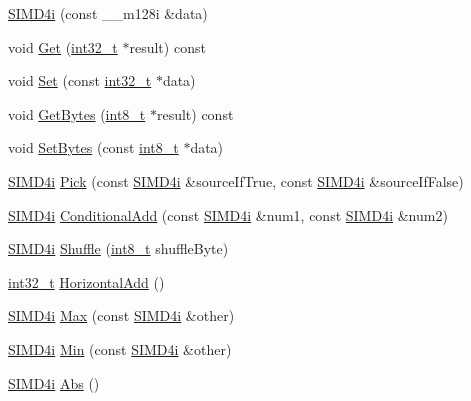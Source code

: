 \begin{DoxyCompactItemize}
\item 
\hyperlink{class_s_i_m_d4i_a9d5c452e93657a04168de24436145454}{S\+I\+M\+D4i} (const \+\_\+\+\_\+m128i \&data)
\item 
void \hyperlink{class_s_i_m_d4i_a7f212da9b94db04c3f146af7a139d9ba}{Get} (\hyperlink{simddefines_8h_ab1967d8591af1a4e48c37fd2b0f184d0}{int32\+\_\+t} $\ast$result) const 
\item 
void \hyperlink{class_s_i_m_d4i_a5fa89cf5be6321da68dd0410d2c78877}{Set} (const \hyperlink{simddefines_8h_ab1967d8591af1a4e48c37fd2b0f184d0}{int32\+\_\+t} $\ast$data)
\item 
void \hyperlink{class_s_i_m_d4i_a5ae9dad273cdb5a7a63ba7c83880c314}{Get\+Bytes} (\hyperlink{simddefines_8h_aef44329758059c91c76d334e8fc09700}{int8\+\_\+t} $\ast$result) const 
\item 
void \hyperlink{class_s_i_m_d4i_a9d606d120af4f52ba32407e970000060}{Set\+Bytes} (const \hyperlink{simddefines_8h_aef44329758059c91c76d334e8fc09700}{int8\+\_\+t} $\ast$data)
\item 
\hyperlink{class_s_i_m_d4i}{S\+I\+M\+D4i} \hyperlink{class_s_i_m_d4i_ad78f06818f79a43994e4f4cb7339f5ea}{Pick} (const \hyperlink{class_s_i_m_d4i}{S\+I\+M\+D4i} \&source\+If\+True, const \hyperlink{class_s_i_m_d4i}{S\+I\+M\+D4i} \&source\+If\+False)
\item 
\hyperlink{class_s_i_m_d4i}{S\+I\+M\+D4i} \hyperlink{class_s_i_m_d4i_a62d3294324d4a18391edc89237dba7e8}{Conditional\+Add} (const \hyperlink{class_s_i_m_d4i}{S\+I\+M\+D4i} \&num1, const \hyperlink{class_s_i_m_d4i}{S\+I\+M\+D4i} \&num2)
\item 
\hyperlink{class_s_i_m_d4i}{S\+I\+M\+D4i} \hyperlink{class_s_i_m_d4i_abffef0eeb3a187e0ce3c0758f50ed34b}{Shuffle} (\hyperlink{simddefines_8h_aef44329758059c91c76d334e8fc09700}{int8\+\_\+t} shuffle\+Byte)
\item 
\hyperlink{simddefines_8h_ab1967d8591af1a4e48c37fd2b0f184d0}{int32\+\_\+t} \hyperlink{class_s_i_m_d4i_a91c7784a2928c70413ea2138d3cc2e60}{Horizontal\+Add} ()
\item 
\hyperlink{class_s_i_m_d4i}{S\+I\+M\+D4i} \hyperlink{class_s_i_m_d4i_a5dead3fb2787d20ed2ede5fcb87546d2}{Max} (const \hyperlink{class_s_i_m_d4i}{S\+I\+M\+D4i} \&other)
\item 
\hyperlink{class_s_i_m_d4i}{S\+I\+M\+D4i} \hyperlink{class_s_i_m_d4i_aaa3c6d22f98c3f2fcb9f22a562a70f8e}{Min} (const \hyperlink{class_s_i_m_d4i}{S\+I\+M\+D4i} \&other)
\item 
\hyperlink{class_s_i_m_d4i}{S\+I\+M\+D4i} \hyperlink{class_s_i_m_d4i_a1a0afd69d518d97eb5b4e4dd111e9de1}{Abs} ()

\end{DoxyCompactItemize}
